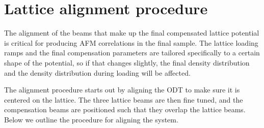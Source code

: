  
 
\section{Lattice alignment procedure}  

The alignment of the beams that make up the final compensated lattice potential
is critical for producing AFM correlations in the final sample.   The lattice
loading ramps and the final compensation parameters are tailored specifically
to a certain shape of the potential, so if that changes slightly, the final
density distribution and the density distribution during loading will be
affected.  

The alignment procedure starts out by aligning the ODT to make sure it is
centered on the lattice.  The three lattice beams are then fine tuned, and the
compensation beams are positioned such that they overlap the lattice beams.
Below we outline the procedure for aligning the system.  
